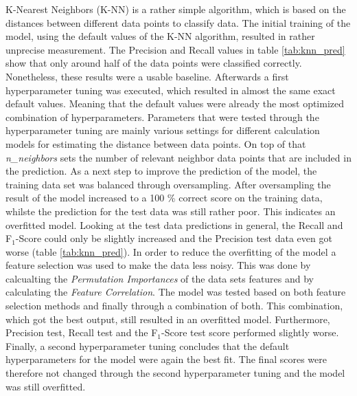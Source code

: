 K-Nearest Neighbors (K-NN) is a rather simple algorithm, which is based on the distances between different data points to classify data. \citep{Yildirim2020} %
The initial training of the model, using the default values of the K-NN algorithm, resulted in rather unprecise measurement. The Precision and Recall values in table \ref{tab:knn_pred} show that only around half of the data points were classified correctly. %
Nonetheless, these results were a usable baseline. Afterwards a first hyperparameter tuning was executed, which resulted in almost the same exact default values. Meaning that the default values were already the most optimized combination of hyperparameters. Parameters that were tested through the hyperparameter tuning are mainly various settings for different calculation models for estimating the distance between data points. On top of that \textit{n\_neighbors} sets the number of relevant neighbor data points that are included in the prediction.
As a next step to improve the prediction of the model, the training data set was balanced through oversampling. After oversampling the result of the model increased to a 100 \% correct score on the training data, whilste the prediction for the test data was still rather poor. This indicates an overfitted model. Looking at the test data predictions in general, the Recall and F$_1$-Score could only be slightly increased and the Precision test data even got worse (table \ref{tab:knn_pred}). %
In order to reduce the overfitting of the model a feature selection was used to make the data less noisy. This was done by calcualting the \textit{Permutation Importances} of the data sets features and by calculating the \textit{Feature Correlation}. The model was tested based on both feature selection methods and finally through a combination of both. This combination, which got the best output, still resulted in an overfitted model. Furthermore, Precision test, Recall test and the F$_1$-Score test score performed slightly worse. %
Finally, a second hyperparameter tuning concludes that the default hyperparameters for the model were again the best fit. The final scores were therefore not changed through the second hyperparameter tuning and the model was still overfitted. %


